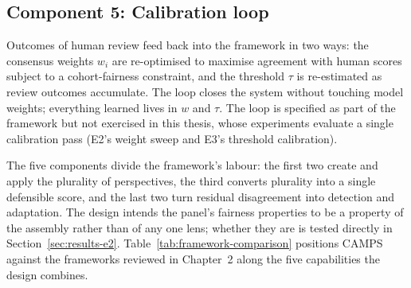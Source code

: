 \subsection*{Component 5: Calibration loop}
Outcomes of human review feed back into the framework in two ways: the
consensus weights $w_i$ are re-optimised to maximise agreement with
human scores subject to a cohort-fairness constraint, and the
threshold $\tau$ is re-estimated as review outcomes accumulate. The
loop closes the system without touching model weights; everything
learned lives in $w$ and $\tau$. The loop is specified as part of the
framework but not exercised in this thesis, whose experiments
evaluate a single calibration pass (E2's weight sweep and E3's
threshold calibration).

\medskip
The five components divide the framework's labour: the first two
create and apply the plurality of perspectives, the third converts
plurality into a single defensible score, and the last two turn
residual disagreement into detection and adaptation. The design
intends the panel's fairness properties to be a property of the
assembly rather than of any one lens; whether they are is tested
directly in Section~\ref{sec:results-e2}.
Table~\ref{tab:framework-comparison} positions CAMPS against the
frameworks reviewed in Chapter~2 along the five capabilities the
design combines.

